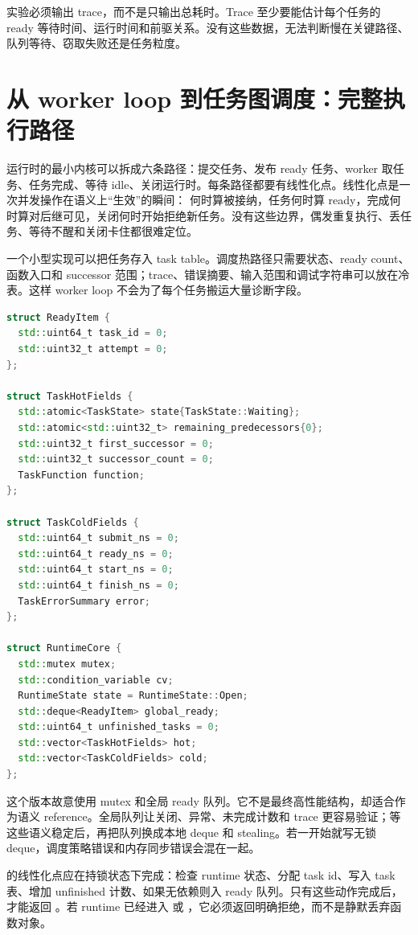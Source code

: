 实验必须输出 trace，而不是只输出总耗时。Trace 至少要能估计每个任务的 ready 等待时间、运行时间和前驱关系。没有这些数据，无法判断慢在关键路径、队列等待、窃取失败还是任务粒度。

\section{从 worker loop 到任务图调度：完整执行路径}

运行时的最小内核可以拆成六条路径：提交任务、发布 ready 任务、worker 取任务、任务完成、等待 idle、关闭运行时。每条路径都要有线性化点。线性化点是一次并发操作在语义上“生效”的瞬间： 何时算被接纳，任务何时算 ready，完成何时算对后继可见，关闭何时开始拒绝新任务。没有这些边界，偶发重复执行、丢任务、等待不醒和关闭卡住都很难定位。

一个小型实现可以把任务存入 task table。调度热路径只需要状态、ready count、函数入口和 successor 范围；trace、错误摘要、输入范围和调试字符串可以放在冷表。这样 worker loop 不会为了每个任务搬运大量诊断字段。

\begin{lstlisting}[language=C++,caption={任务运行时表的最小形态}]
struct ReadyItem {
  std::uint64_t task_id = 0;
  std::uint32_t attempt = 0;
};

struct TaskHotFields {
  std::atomic<TaskState> state{TaskState::Waiting};
  std::atomic<std::uint32_t> remaining_predecessors{0};
  std::uint32_t first_successor = 0;
  std::uint32_t successor_count = 0;
  TaskFunction function;
};

struct TaskColdFields {
  std::uint64_t submit_ns = 0;
  std::uint64_t ready_ns = 0;
  std::uint64_t start_ns = 0;
  std::uint64_t finish_ns = 0;
  TaskErrorSummary error;
};

struct RuntimeCore {
  std::mutex mutex;
  std::condition_variable cv;
  RuntimeState state = RuntimeState::Open;
  std::deque<ReadyItem> global_ready;
  std::uint64_t unfinished_tasks = 0;
  std::vector<TaskHotFields> hot;
  std::vector<TaskColdFields> cold;
};
\end{lstlisting}

这个版本故意使用 mutex 和全局 ready 队列。它不是最终高性能结构，却适合作为语义 reference。全局队列让关闭、异常、未完成计数和 trace 更容易验证；等这些语义稳定后，再把队列换成本地 deque 和 stealing。若一开始就写无锁 deque，调度策略错误和内存同步错误会混在一起。

 的线性化点应在持锁状态下完成：检查 runtime 状态、分配 task id、写入 task 表、增加 unfinished 计数、如果无依赖则入 ready 队列。只有这些动作完成后， 才能返回 。若 runtime 已经进入  或 ，它必须返回明确拒绝，而不是静默丢弃函数对象。

